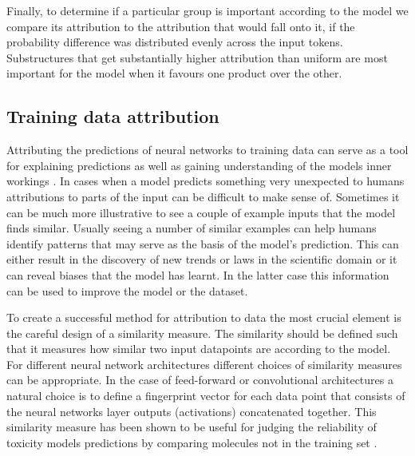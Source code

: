 Finally, to determine if a particular group is important according to the model we compare its attribution to the attribution that would fall onto it, if the probability difference was distributed evenly across the input tokens. Substructures that get substantially higher attribution than uniform are most important for the model when it favours one product over the other.

\subsection{Training data attribution} \label{subsec:data_attribution}
Attributing the predictions of neural networks to training data can serve as a tool for explaining predictions as well as gaining understanding of the models inner workings \cite{tetko2002}. In cases when a model predicts something very unexpected to humans attributions to parts of the input can be difficult to make sense of. Sometimes it can be much more illustrative to see a couple of example inputs that the model finds similar. Usually seeing a number of similar examples can help humans identify patterns that may serve as the basis of the model's prediction. This can either result in the discovery of new trends or laws in the scientific domain or it can reveal biases that the model has learnt. In the latter case this information can be used to improve the model or the dataset.

To create a successful method for attribution to data the most crucial element is the careful design of a similarity measure. The similarity should be defined such that it measures how similar two input datapoints are according to the model. For different neural network architectures different choices of similarity measures can be appropriate. In the case of feed-forward or convolutional architectures a natural choice is to define a fingerprint vector for each data point that consists of the neural networks layer outputs (activations) concatenated together. This similarity measure has been shown to be useful for judging the reliability of toxicity models predictions by comparing molecules not in the training set \cite{Allen2020}.


